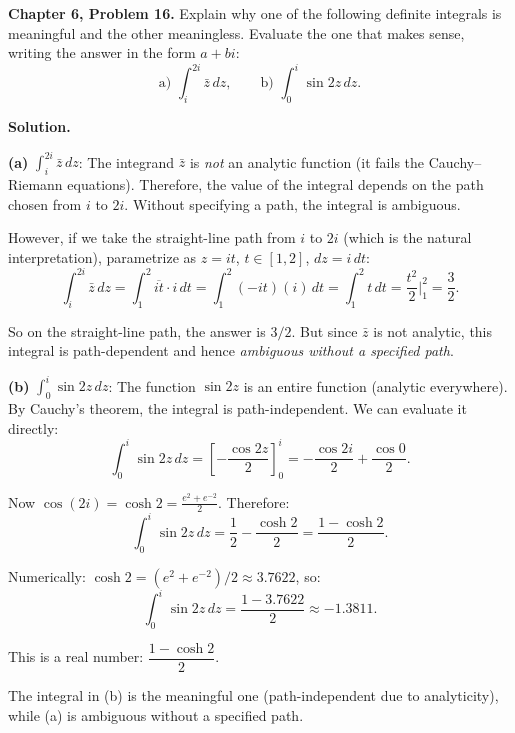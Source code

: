 \documentclass[12pt]{article}
\begin{document}
\textbf{Chapter 6, Problem 16.} Explain why one of the following definite integrals is meaningful and the other meaningless. Evaluate the one that makes sense, writing the answer in the form $a + bi$:
\[
\text{a) } \int_i^{2i} \bar{z}\,dz, \qquad \text{b) } \int_0^i \sin 2z\,dz.
\]

\bigskip
\textbf{Solution.}

\textbf{(a)} $\int_i^{2i}\bar{z}\,dz$: The integrand $\bar{z}$ is \emph{not} an analytic function (it fails the Cauchy--Riemann equations). Therefore, the value of the integral depends on the path chosen from $i$ to $2i$. Without specifying a path, the integral is ambiguous.

However, if we take the straight-line path from $i$ to $2i$ (which is the natural interpretation), parametrize as $z = it$, $t \in [1,2]$, $dz = i\,dt$:
\[
\int_i^{2i}\bar{z}\,dz = \int_1^2 \overline{it}\cdot i\,dt = \int_1^2(-it)(i)\,dt = \int_1^2 t\,dt = \frac{t^2}{2}\Big|_1^2 = \frac{3}{2}.
\]

So on the straight-line path, the answer is $3/2$. But since $\bar{z}$ is not analytic, this integral is path-dependent and hence \emph{ambiguous without a specified path}.

\textbf{(b)} $\int_0^i \sin 2z\,dz$: The function $\sin 2z$ is an entire function (analytic everywhere). By Cauchy's theorem, the integral is path-independent. We can evaluate it directly:
\[
\int_0^i \sin 2z\,dz = \left[-\frac{\cos 2z}{2}\right]_0^i = -\frac{\cos 2i}{2} + \frac{\cos 0}{2}.
\]

Now $\cos(2i) = \cosh 2 = \frac{e^2 + e^{-2}}{2}$. Therefore:
\[
\int_0^i \sin 2z\,dz = \frac{1}{2} - \frac{\cosh 2}{2} = \frac{1 - \cosh 2}{2}.
\]

Numerically: $\cosh 2 = (e^2 + e^{-2})/2 \approx 3.7622$, so:
\[
\int_0^i \sin 2z\,dz = \frac{1 - 3.7622}{2} \approx -1.3811.
\]

This is a real number: $\boxed{\dfrac{1-\cosh 2}{2}}$.

The integral in (b) is the meaningful one (path-independent due to analyticity), while (a) is ambiguous without a specified path.
\end{document}
